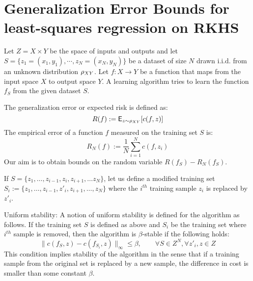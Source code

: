 \chapter{Generalization Error Bounds for least-squares regression on RKHS }%
\label{a:bousquet}
Let $Z = X \times Y$ be the space of inputs and outputs and let $S = \{z_1 = (x_1, y_1), \cdots,z_N = (x_N,y_N)\}$ be a dataset of size $N$ drawn i.i.d. from an unknown distribution $\rho_{XY}$. Let $f:X \to Y$ be a function that maps from the input space $X$ to output space $Y$. A learning algorithm tries to learn the function $f_S$ from the given dataset $S$. 

The generalization error or expected risk is defined as:
\[
R(f) := {\sf E}_{z \sim \rho_{XY}} [c(f,z)]
\]
The empirical error of a function $f$ measured on the training set $S$ is:
\[
R_N(f) := \frac{1}{N}\sum_{i=1}^N c(f,z_i)
\]
Our aim is to obtain bounds on the random variable $R(f_S) - R_N(f_S)$. 

If $S = \{z_1,\dots, z_{i-1},z_i,z_{i+1},\dots z_N\}$, let us define a modified training set $S_i :=\{z_1,\dots, z_{i-1},z'_i,z_{i+1},\dots,z_N\}$ where the $i^{th}$ training sample $z_i$ is replaced by $z'_i$.

Uniform stability: A notion of uniform stability is defined for the algorithm as follows. If the training set $S$ is defined as above and $S_i$ be the training set where $i^{th}$ sample is removed, then the algorithm is $\beta$-stable if the following holds:
\[
\|c(f_S, z ) - c(f_{S_i},z)\|_{\infty} \leq \beta, \qquad \forall S \in Z^N, \forall z'_i, z \in Z
\]
This condition implies stability of the algorithm in the sense that if a training sample from the original set is replaced by a new sample, the difference in cost is smaller than some constant $\beta$. 

